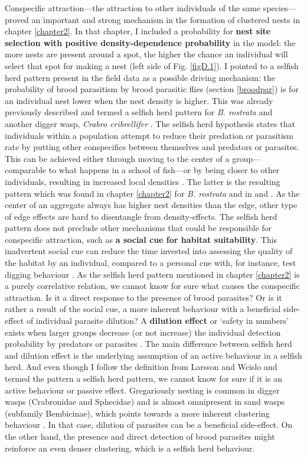 \documentclass[10pt, twoside]{book} %
\begin{document}
	Conspecific attraction---the attraction to other individuals of the same species---proved an important and strong mechanism in the formation of clustered nests in chapter \ref{chapter2}. In that chapter, I included a probability for \textbf{nest site selection with positive density-dependence probability} in the model: the more nests are present around a spot, the higher the chance an individual will select that spot for making a nest (left side of Fig. \ref{figD.1}). I pointed to a selfish herd pattern present in the field data as a possible driving mechanism: the probability of brood parasitism by brood parasitic flies (section \ref{broodpar}) is for an individual nest lower when the nest density is higher. This was already previously described and termed a selfish herd pattern for \textit{B. rostrata} and another digger wasp, \textit{Crabro cribrellifer} \citep{wcislo1984, larsson1986}. The selfish herd hypothesis states that individuals within a population attempt to reduce their predation or parasitism rate by putting other conspecifics between themselves and predators or parasites. This can be achieved either through moving to the center of a group---comparable to what happens in a school of fish---or by being closer to other individuals, resulting in increased local densities \citep{hamilton1971, mooring1992}. The latter is the resulting pattern which was found in chapter \ref{chapter2} for \textit{B. rostrata} and in \citet{larsson1986} and \citet{wcislo1984}. As the center of an aggregate always has higher nest densities than the edge, other type of edge effects are hard to disentangle from density-effects. The selfish herd pattern does not preclude other mechanisms that could be responsible for conspecific attraction, such as \textbf{a social cue for habitat suitability}. This inadvertent social cue can reduce the time invested into assessing the quality of the habitat by an individual, compared to a personal cue with, for instance, test digging behaviour \citep{dall2005, buxton2020}. As the selfish herd pattern mentioned in chapter \ref{chapter2} is a purely correlative relation, we cannot know for sure what causes the conspecific attraction. Is it a direct response to the presence of brood parasites? Or is it rather a result of the social cue, a more inherent behaviour with a beneficial side-effect of individual parasite dilution? A \textbf{dilution effect} or `safety in numbers' exists when larger groups decrease (or not increase) the individual detection probability by predators or parasites \citep{mooring1992}. The main difference between selfish herd and dilution effect is the underlying assumption of an active behaviour in a selfish herd. And even though I follow the definition from Larsson and Wcislo and termed the pattern a selfish herd pattern, we cannot know for sure if it is an active behaviour or passive effect. Gregariously nesting is common in digger wasps (Crabronidae and Sphecidae) and is almost omnipresent in sand wasps (subfamily Bembicinae), which points towards a more inherent clustering behaviour \citep{evans1957, evans2007}. In that case, dilution of parasites can be a beneficial side-effect. On the other hand, the presence and direct detection of brood parasites might reinforce an even denser clustering, which is a selfish herd behaviour. 
\end{document}
